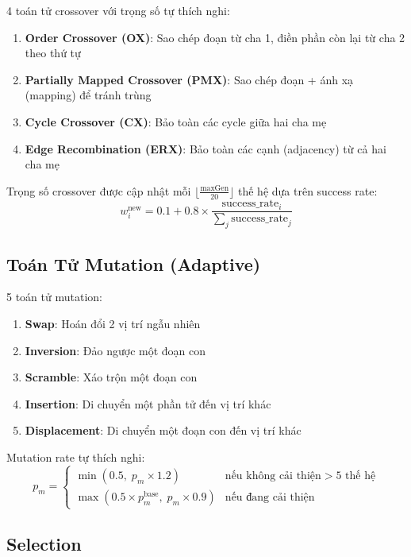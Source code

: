 \documentclass[12pt,a4paper]{article}
\begin{document}
4 toán tử crossover với trọng số tự thích nghi:

\begin{enumerate}[nosep]
    \item \textbf{Order Crossover (OX)}: Sao chép đoạn từ cha 1, điền phần còn lại từ cha 2 theo thứ tự
    \item \textbf{Partially Mapped Crossover (PMX)}: Sao chép đoạn + ánh xạ (mapping) để tránh trùng
    \item \textbf{Cycle Crossover (CX)}: Bảo toàn các cycle giữa hai cha mẹ
    \item \textbf{Edge Recombination (ERX)}: Bảo toàn các cạnh (adjacency) từ cả hai cha mẹ
\end{enumerate}

Trọng số crossover được cập nhật mỗi $\lfloor \frac{\text{maxGen}}{20} \rfloor$ thế hệ dựa trên success rate:
\begin{equation}
    w_i^{\text{new}} = 0.1 + 0.8 \times \frac{\text{success\_rate}_i}{\sum_j \text{success\_rate}_j}
\end{equation}

\subsection{Toán Tử Mutation (Adaptive)}

5 toán tử mutation:
\begin{enumerate}[nosep]
    \item \textbf{Swap}: Hoán đổi 2 vị trí ngẫu nhiên
    \item \textbf{Inversion}: Đảo ngược một đoạn con
    \item \textbf{Scramble}: Xáo trộn một đoạn con
    \item \textbf{Insertion}: Di chuyển một phần tử đến vị trí khác
    \item \textbf{Displacement}: Di chuyển một đoạn con đến vị trí khác
\end{enumerate}

Mutation rate tự thích nghi:
\begin{equation}
    p_m = \begin{cases}
        \min(0.5, \; p_m \times 1.2) & \text{nếu không cải thiện} > 5 \text{ thế hệ} \\
        \max(0.5 \times p_m^{\text{base}}, \; p_m \times 0.9) & \text{nếu đang cải thiện}
    \end{cases}
\end{equation}

\subsection{Selection}
\end{document}
